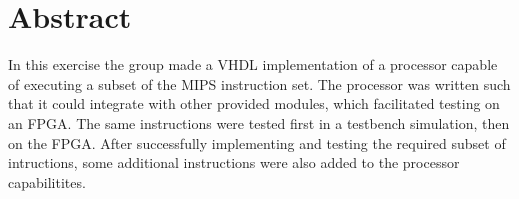 \chapter*{Abstract}

In this exercise the group made a VHDL implementation of a processor capable of executing a subset of the MIPS instruction set.
The processor was written such that it could integrate with other provided modules,
which facilitated testing on an FPGA.
The same instructions were tested first in a testbench simulation,
then on the FPGA.
After successfully implementing and testing the required subset of intructions,
some additional instructions were also added to the processor capabilitites.
